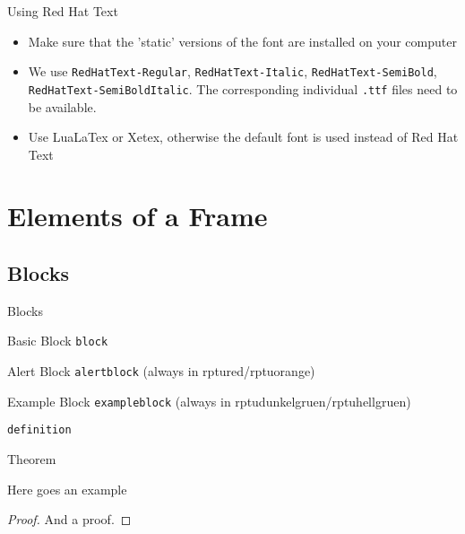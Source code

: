 \documentclass[]{beamer}
\begin{document}
\begin{frame}{Using Red Hat Text}
	\begin{itemize}
		\item Make sure that the 'static' versions of the font are installed on your computer
		\item We use \texttt{RedHatText-Regular}, \texttt{RedHatText-Italic}, \texttt{RedHatText-SemiBold}, \texttt{RedHatText-SemiBoldItalic}. The corresponding individual \texttt{.ttf} files need to be available.
		\item Use LuaLaTex or Xetex, otherwise the default font is used instead of Red Hat Text
	\end{itemize}
\end{frame}

\section{Elements of a Frame}
\rptusectionpage
	
\subsection{Blocks}

\begin{frame}{Blocks}
	\begin{block}{Basic Block}
	\texttt{block}
	\end{block}
	\begin{alertblock}{Alert Block}
	\texttt{alertblock} (always in rptured/rptuorange)
	\end{alertblock}
\begin{exampleblock}{Example Block}
	\texttt{exampleblock}  (always in rptudunkelgruen/rptuhellgruen)
	\end{exampleblock}
\end{frame}

\begin{frame}
		\begin{definition}
		\texttt{definition}
	\end{definition}
		\begin{Theorem}
			Theorem
		\end{Theorem}
		\begin{Example}
			Here goes an example
		\end{Example}
		\begin{proof}
			And a proof.
		\end{proof}
\end{frame}
\end{document}
